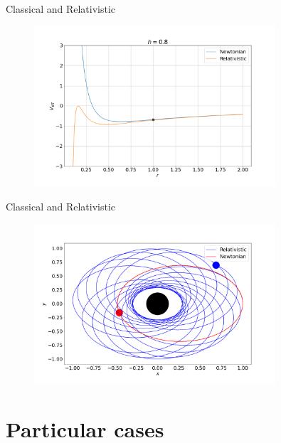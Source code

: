\documentclass[xcolor=dvipsnames]{beamer}
\begin{document}
\begin{frame}{Classical and Relativistic}
    
    \begin{figure}[h!]
        \centering
        \includegraphics[width=0.8\textwidth]{Presentations/Images/2_veff_newrel.png}
    \end{figure}
    
\end{frame}



\begin{frame}{Classical and Relativistic}

        \begin{figure}[h!]
        \centering
        \includegraphics[width=0.8\textwidth]{Presentations/Images/2_class_rel_orbit.png}
    \end{figure}
    
\end{frame}


\section{Particular cases}
\end{document}

